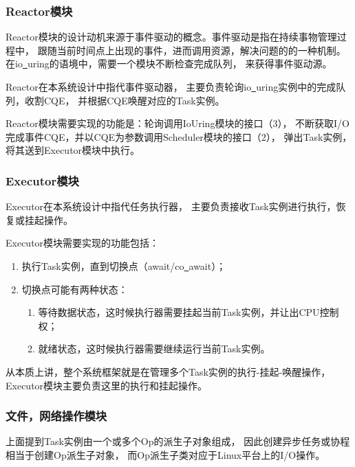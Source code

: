 \documentclass[supercite]{HustGraduPaper}
\theoremstyle{definition}
\begin{document}
\subsubsection{Reactor模块}

Reactor模块的设计动机来源于事件驱动的概念。事件驱动是指在持续事物管理过程中，
跟随当前时间点上出现的事件，进而调用资源，解决问题的的一种机制。
在io\underline{~}uring的语境中，需要一个模块不断检查完成队列，
来获得事件驱动源。\par

Reactor在本系统设计中指代事件驱动器，
主要负责轮询io\underline{~}uring实例中的完成队列，收割CQE，
并根据CQE唤醒对应的Task实例。\par

Reactor模块需要实现的功能是：轮询调用IoUring模块的接口（3），
不断获取I/O完成事件CQE，并以CQE为参数调用Scheduler模块的接口（2），
弹出Task实例，将其送到Executor模块中执行。\par

\subsubsection{Executor模块}

Executor在本系统设计中指代任务执行器，
主要负责接收Task实例进行执行，恢复或挂起操作。\par

Executor模块需要实现的功能包括：

\begin{enumerate}[label={(\arabic*)}]
  \item 执行Task实例，直到切换点（await/co\underline{~}await）；
  \item 切换点可能有两种状态：
    \begin{enumerate}
      \item 等待数据状态，这时候执行器需要挂起当前Task实例，并让出CPU控制权；
      \item 就绪状态，这时候执行器需要继续运行当前Task实例。
    \end{enumerate}
\end{enumerate}

从本质上讲，整个系统框架就是在管理多个Task实例的执行-挂起-唤醒操作，
Executor模块主要负责这里的执行和挂起操作。\par

\subsubsection{文件，网络操作模块}
上面提到Task实例由一个或多个Op的派生子对象组成，
因此创建异步任务或协程相当于创建Op派生子对象，
而Op派生子类对应于Linux平台上的I/O操作。\par
\end{document}
